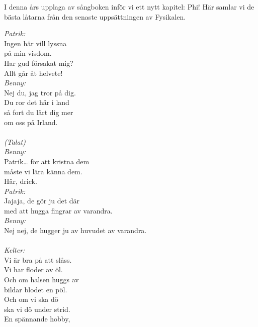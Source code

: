 \documentclass[a6paper, 10pt, twoside]{article}
\begin{document}
\noindent
{}
\small
\vspace{10pt}

\noindent
\small
I denna års upplaga av sångboken inför vi ett nytt kapitel: Phi! Här samlar vi de bästa låtarna från den senaste uppsättningen av Fysikalen. 


\begin{center}
\end{center}
\begin{lyrics}
\textit{Patrik:}\\
Ingen här vill lyssna\\
på min visdom.\\
Har gud försakat mig?\\
Allt går åt helvete! \\
\textit{Benny:}\\
Nej du, jag tror på dig.\\ 
Du ror det här i land \\ 
så fort du lärt dig mer \\
om oss på Irland. \\
\\
\textit{(Talat)}\\
\textit{Benny:}\\
Patrik… för att kristna dem\\
måste vi lära känna dem.\\
Här, drick.\\
\textit{Patrik:}\\
Jajaja, de gör ju det där\\
med att hugga fingrar av varandra.\\
\textit{Benny:}\\
Nej nej, de hugger ju av huvudet av varandra. \\
\\
\textit{Kelter:}\\
Vi är bra på att slåss.\\
Vi har floder av öl.\\
Och om halsen huggs av \\
bildar blodet en pöl.\\
Och om vi ska dö\\
ska vi dö under strid.\\
En spännande hobby, \\

\end{lyrics}
\end{document}

